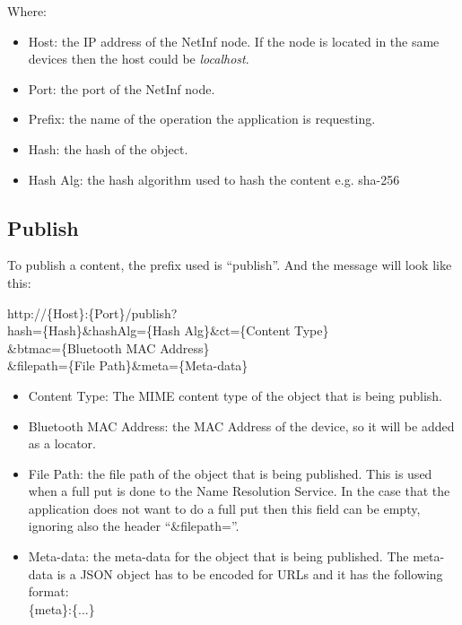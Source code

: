 \documentclass[10pt,a4paper]{article}
\begin{document}
Where:

\begin{itemize}
 \item Host: the IP address of the NetInf node. If the node is located in the same devices then the host could be \textit{localhost}.
 \item Port: the port of the NetInf node.
 \item Prefix: the name of the operation the application is requesting. 
 \item Hash: the hash of the object.
 \item Hash Alg: the hash algorithm used to hash the content e.g. sha-256
\end{itemize}

\subsection{Publish}
To publish a content, the prefix used is ``publish''. And the message will look like this:\\

\begin{center}
http://\{Host\}:\{Port\}/publish?\\
hash=\{Hash\}\&hashAlg=\{Hash Alg\}\&ct=\{Content Type\}\\
\&btmac=\{Bluetooth MAC Address\}\\
\&filepath=\{File Path\}\&meta=\{Meta-data\}\\
\end{center}

\begin{itemize}
 \item Content Type: The MIME content type of the object that is being publish.
 \item Bluetooth MAC Address: the MAC Address of the device, so it will be added as a locator.
 \item File Path: the file path of the object that is being published. This is used when a full put is done to the Name Resolution Service. In the case that the application
 does not want to do a full put then this field can be empty, ignoring also the header ``\&filepath=''.
 \item Meta-data: the meta-data for the object that is being published. The meta-data is a JSON object has to be encoded for URLs and it has the following format:\\
  \{meta\}:\{...\}\\
 \end{itemize}
\end{document}
